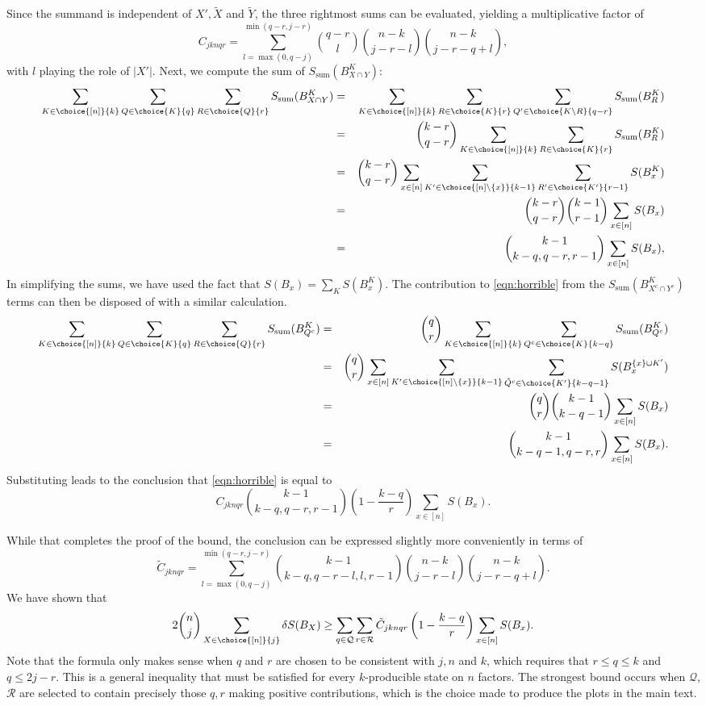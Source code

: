 \documentclass[12pt]{article}
\newcommand{\be}{\begin{equation}}
\newcommand{\ee}{\end{equation}}
\newcommand{\beq}{\begin{eqnarray}}
\newcommand{\eeq}{\end{eqnarray}}
\def\Sadd{{S_{\text{sum}}}}
\numberwithin{equation}{section}
\begin{document}
Since the summand is independent of $X', \tilde{X}$ and $\tilde{Y}$, the three rightmost sums can be evaluated, yielding a multiplicative factor of
\be
C_{jknqr}
= \sum_{l = {\max(0,q-j)}}^{\min(q-r,j-r)}
	\binom{q-r}{l}  \binom{n-k}{j-r-l} \binom{n-k}{j-r-q+l},
\ee
with $l$ playing the role of $|X'|$. Next, we compute the sum of $\Sadd(B^K_{X\cap Y})$:
\beq
\sum_{K \in \choice{[n]}{k}} \sum_{Q \in \choice{K}{q}} \sum_{R \in \choice{Q}{r}}
	\Sadd(B^K_{X \cap Y})
&=&
\sum_{K \in \choice{[n]}{k}} \sum_{R \in \choice{K}{r}} \sum_{Q' \in \choice{K\setminus R}{q-r}}
	\Sadd(B^K_R) \\
&=&
\binom{k-r}{q-r} \sum_{K \in \choice{[n]}{k}} \sum_{R \in \choice{K}{r}}
	\Sadd(B^K_R) \\
&=&
\binom{k-r}{q-r}  \sum_{x \in [n]} \sum_{K' \in \choice{[n] \setminus \{x\}}{k-1}}
	\sum_{R' \in \choice{K'}{r-1}} S(B_x^K) \\
&=&
\binom{k-r}{q-r} \binom{k-1}{r-1} \sum_{x \in [n]} S(B_x) \\
&=&
\binom{k-1}{k-q, q-r, r-1} \sum_{x \in [n]} S(B_x),
\eeq
In simplifying the sums, we have used the fact that $S(B_x) = \sum_K S(B_x^K)$.
The contribution to \eqref{eqn:horrible} from the $\Sadd(B^K_{X^c \cap Y^c})$ terms can then be disposed of with a similar calculation.
\beq
\sum_{K \in \choice{[n]}{k}} \sum_{Q \in \choice{K}{q}} \sum_{R \in \choice{Q}{r}}
	\Sadd(B^K_{Q^c})
&=&
\binom{q}{r} \sum_{K \in \choice{[n]}{k}} \sum_{Q^c \in \choice{K}{k-q}}
		\Sadd(B^K_{Q^c}) \\
&=&
\binom{q}{r} \sum_{x \in [n]} \sum_{K' \in \choice{[n]\setminus\{x\}}{k-1}}
	\sum_{\tilde{Q}^c \in \choice{K'}{k-q-1}}
	S( B_x^{\{ x \} \cup K'} ) \\
&=&
\binom{q}{r} \binom{k-1}{k-q-1} \sum_{x \in [n]} S(B_x) \\
&=&
\binom{k-1}{k-q-1, q-r, r}  \sum_{x \in [n]} S(B_x).
\eeq
Substituting leads to the conclusion that \eqref{eqn:horrible} is equal to
\be
C_{jknqr} \binom{k-1}{k-q, q-r, r-1} \left( 1 - \frac{k-q}{r} \right) \sum_{x \in [n]} S(B_x).
\label{eqn:multi-lb2}
\ee

While that completes the proof of the bound, the conclusion can be expressed slightly more conveniently in terms of
\be
\tilde{C}_{jknqr}
= \sum_{l = {\max(0,q-j)}}^{\min(q-r,j-r)}
	\binom{k-1}{k-q,q-r-l,l,r-1}  \binom{n-k}{j-r-l} \binom{n-k}{j-r-q+l}.
\ee
We have shown that
\be
 2 \binom{n}{j} \sum_{X \in \choice{[n]}{j}} \delta S(B_X)
\geq
\sum_{q \in \mathcal{Q}} \sum_{r \in \mathcal{R}}
\tilde{C}_{jknqr} \left( 1 - \frac{k-q}{r} \right) \sum_{x \in [n]} S(B_x).
\label{eqn:multi-lb}
\ee
Note that the formula only makes sense when $q$ and $r$ are chosen to be consistent with $j, n$ and $k$, which requires that $r \leq q \leq k$ and $q \leq 2j-r$. This is a general inequality that must be satisfied for every $k$-producible state on $n$ factors. The strongest bound occurs when $\mathcal{Q}$, $\mathcal{R}$ are selected to contain precisely those $q,r$ making positive contributions, which is the choice made to produce the plots in the main text.





\end{document}
